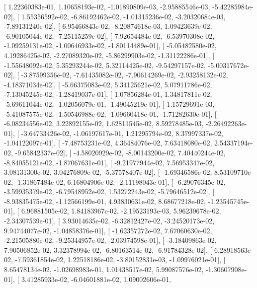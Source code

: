 \documentclass{article}
\begin{document}
       [  1.22360383e-01,   1.10658193e-02,  -1.01890809e-03,
         -2.95885546e-03,  -5.42285984e-02],
       [  1.55356592e-02,  -6.86192462e-02,  -1.01315236e-02,
         -3.20320684e-03,  -7.89131240e-02],
       [  6.95466843e-02,  -8.20874618e-03,   1.09423639e-02,
         -6.90105044e-02,  -7.25115259e-02],
       [  7.92654484e-02,  -6.53970308e-02,  -1.09259131e-02,
         -1.00646933e-02,  -1.80114489e-01],
       [ -5.05482580e-02,   4.19286425e-02,  -2.27089320e-02,
         -5.86299903e-02,  -1.31122286e-01],
       [ -1.55648092e-02,   5.35293244e-02,   5.32114425e-02,
         -9.54297157e-02,  -5.00317672e-02],
       [ -3.87599356e-02,  -7.61435082e-02,  -7.90614269e-02,
         -2.93258132e-02,  -4.18371034e-02],
       [ -5.66375083e-02,   5.34125621e-02,   5.07911786e-02,
         -7.13045245e-02,  -1.28419037e-01],
       [  1.07856284e-01,   1.34817811e-02,  -5.69611044e-02,
         -1.02056079e-01,  -1.49045219e-01],
       [  1.15729691e-03,  -5.41087575e-02,  -1.50546988e-02,
         -1.09660418e-01,  -1.71282630e-01],
       [ -6.08234556e-02,   3.22892155e-02,   1.62811545e-02,
          8.59278485e-03,  -2.26492263e-01],
       [ -3.64733426e-02,  -1.06197617e-01,   1.21295794e-02,
          8.37997337e-02,  -1.04122097e-01],
       [ -7.48753231e-02,   4.36484076e-02,   7.63418080e-02,
          2.54337194e-02,  -9.65842337e-02],
       [ -4.58020929e-02,  -8.00143200e-02,   7.40440244e-02,
         -8.84055121e-02,  -1.87067631e-01],
       [ -9.21977944e-02,   7.56953347e-02,   3.08131300e-02,
          3.04276809e-02,  -5.37578407e-02],
       [ -1.69346586e-02,   8.53109710e-02,  -1.31867484e-02,
          6.16804906e-02,  -2.11198043e-01],
       [ -6.29076345e-02,  -3.59935379e-02,  -6.79548952e-02,
          1.53272243e-02,  -5.79646512e-02],
       [ -8.93835475e-02,  -1.12566199e-01,   4.93830631e-02,
          8.68677218e-02,  -1.23545745e-01],
       [  6.96881505e-02,   1.84183967e-02,  -2.19523193e-03,
          5.96239678e-02,  -2.34307539e-01],
       [  3.93014635e-02,  -6.32812427e-02,  -3.24520173e-02,
          9.94744077e-02,  -1.04858376e-01],
       [ -1.62357272e-02,   7.67060630e-02,  -2.21505880e-02,
         -9.25344957e-02,  -2.03974598e-01],
       [ -3.18409863e-02,   7.90506852e-02,   3.32378994e-02,
         -6.80163514e-02,  -6.91784328e-02],
       [  6.28918563e-02,  -7.59361854e-02,   1.22518186e-02,
         -3.80152831e-03,  -1.09976021e-01],
       [  8.65478134e-02,  -1.02698983e-01,   1.01438517e-02,
          5.99087576e-02,  -1.30607908e-01],
       [  3.41285933e-02,  -6.04601881e-02,   1.09002606e-01,
\end{document}
